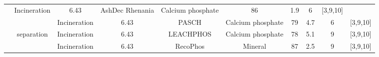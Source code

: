 \documentclass[]{elsarticle}
\begin{document}
\begin{table}
{\begin{threeparttable}
\begin{tabular}{@{}cccccccccc@{}}
				& Incineration                                                                     & 6.43                                      & AshDec Rhenania                                                                          & Calcium phosphate                                                                 & 86                                                                                    & 1.9                                  & 6                                                            &    [3,9,10]      \\
				&                                                                                                                                                         & Incineration                                                                     & 6.43                                      & PASCH                                                                                    & Calcium phosphate                                                                 & 79                                                                                    & 4.7                                  & 6                                                            &     [3,9,10]     \\
				&                                                                                                                                separation                         & Incineration                                                                     & 6.43                                      & LEACHPHOS                                                                                & Calcium phosphate                                                                 & 78                                                                                    & 5.1                                  & 9                                                            &      [3,9,10]    \\
				&                                                                                                                                                         & Incineration                                                                     & 6.43                                      & RecoPhos                                                                                 & Mineral                                                                           & 87                                                                                    & 2.5                                  & 9                                                            &     [3,9,10]     \\

\end{tabular}
\end{threeparttable}}
\end{table}
\end{document}
